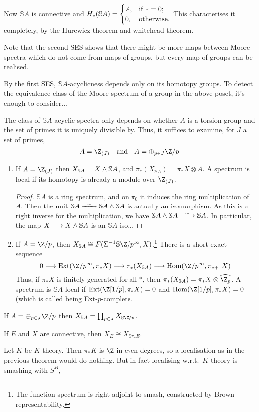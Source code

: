\documentclass[11pt]{article}
\begin{document}
\begin{MarkusLocalisationPractice}
\begin{exmp*}
Now $\mathbb{S}A$ is connective and $H_*(\mathbb{S}A)=\begin{cases}
A,&\textup{if }*=0;\\
0,&\textup{otherwise}.
\end{cases}$ This characterises it completely, by the Hurewicz theorem and whitehead theorem.

Note that the second SES shows that there might be more maps between Moore spectra which do not come from maps of groups, but every map of groups can be realised.
\end{exmp*}
By the first SES, $\mathbb{S}A$-acyclicness depends only on its homotopy groups. To detect the equivalence class of the Moore spectrum of a group in the above poset, it's enough to consider...

The class of $\mathbb{S}A$-acyclic spectra only depends on whether $A$ is a torsion group and the set of primes it is uniquely divisible by. Thus, it suffices to examine, for $J$ a set of primes,
\[A=\Z_{(J)}\textup{\quad and\quad }A=\oplus_{p\in J}\Z/p\]
\begin{enumerate}\squishlist
\item If $A=\Z_{(J)}$ then $X_{\mathbb{S}A}=X\wedge \mathbb{S}A$, and $\pi_*(X_{\mathbb{S}A})=\pi_*X\otimes A$. A spectrum is local if its homotopy is already a module over $\Z_{(J)}$.
\begin{proof}
$\mathbb{S}A$ is a ring spectrum, and on $\pi_0$ it induces the ring multiplication of $A$. Then the unit $\mathbb{S}A\weakequiv\mathbb{S}A \sprod\mathbb{S}A$ is actually an isomorphism. As this is a right inverse for the multiplication, we have $\mathbb{S}A\sprod\mathbb{S}A \weakequiv\mathbb{S}A$. In particular, the map $X\longrightarrow X\wedge \mathbb{S}A$ is an $\mathbb{S}A$-iso...
\end{proof}
\item If $A=\Z/p$, then $X_{\mathbb{S}A}\cong F(\Sigma^{-1}\mathbb{S}\Z/p^\infty,X)$.\footnote{The function spectrum is right adjoint to smash, constructed by Brown representability.} There is a short exact sequence
\[0\to\Ext(\Z/p^\infty,\pi_{*}X)\to \pi_*(X_{\mathbb{S}A})\to\Hom(\Z/p^\infty,\pi_{*+1}X)\]
Thus, if $\pi_*X$ is finitely generated for all $*$, then $\pi_*(X_{\mathbb{S}A})= \pi_{*}X\otimes\widehat{\Z_p}$.
A spectrum is $\mathbb{S}A$-local if $\Ext(\Z[1/p],\pi_*X)=0$ and $\Hom(\Z[1/p],\pi_*X)=0$ (which is called being Ext-$p$-complete.
\end{enumerate}
\begin{thm*}
If $A=\oplus_{p\in J}\Z/p$ then $X_{\mathbb{S}A}=\prod_{p\in J}X_{\mathbb{S}\Z/p}$.
\end{thm*}
\begin{thm*}
If $E$ and $X$ are connective, then $X_E\cong X_{\mathbb{S}\pi_*E}$.
\end{thm*}
\begin{defn*}
Let $K$ be $K$-theory. Then $\pi_*K$ is $\Z$ in even degrees, so a localisation as in the previous theorem would do nothing. But in fact localising w.r.t.\ $K$-theory is smashing with $S^B$, 
\end{defn*}


\pagebreak
\end{MarkusLocalisationPractice}
\end{document}
